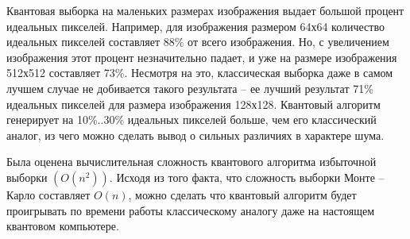 Квантовая выборка на маленьких размерах изображения выдает большой процент идеальных пикселей. Например, для изображения размером 64х64 количество идеальных пикселей составляет 88\% от всего изображения. Но, с увеличением изображения этот процент незначительно падает, и уже на размере изображения 512х512 составляет 73\%. Несмотря на это, классическая выборка даже в самом лучшем случае не добивается такого результата -- ее лучший результат 71\% идеальных пикселей для размера изображения 128х128. Квантовый алгоритм генерирует на 10\%..30\% идеальных пикселей больше, чем его классический аналог, из чего можно сделать вывод о сильных различиях в характере шума.

Была оценена вычислительная сложность квантового алгоритма избыточной выборки $(O(n^2))$. Исходя из того факта, что сложность выборки Монте -- Карло составляет $O(n)$, можно сделать что квантовый алгоритм будет проигрывать по времени работы классическому аналогу даже на настоящем квантовом компьютере.
